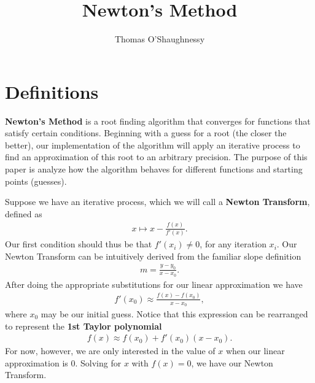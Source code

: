 \documentclass[12pt]{article}
\author{Thomas O'Shaughnessy}
\title{Newton's Method}
\begin{document}
\maketitle
\section{Definitions}

\textbf{Newton's Method} is a root finding algorithm that converges for functions 
that satisfy certain
conditions. Beginning with a guess for a root (the closer the better), our implementation
of the algorithm will apply an iterative process to find an approximation of this root
to an arbitrary precision. The purpose of this paper is analyze how the algorithm behaves
for different functions and starting points (guesses).

Suppose we have an iterative process, which we will call a \textbf{Newton Transform}, defined as
\begin{gather*}
				x \mapsto x - \frac{f(x)}{f'(x)}.
\end{gather*}
Our first condition should thus be that $f'(x_i) \neq 0$, for any iteration $x_i$.
Our Newton Transform can be intuitively derived from the familiar slope definition
\begin{gather*}
				m=\frac{y-y_0}{x-x_0}.
\end{gather*}
After doing the appropriate substitutions for our linear approximation we have
\begin{gather*}
				f'(x_0)\approx\frac{f(x)-f(x_0)}{x-x_0},
\end{gather*}
where $x_0$ may be our initial guess. Notice that this expression can be rearranged
to represent the \textbf{1st Taylor polynomial}
\begin{gather*}
				f(x)\approx f(x_0)+f'(x_0)(x-x_0).
\end{gather*}
For now, however, we are only interested in the value of $x$ when our
linear approximation is $0$. Solving for $x$ with $f(x) = 0$, we have our Newton Transform.
\end{document}

